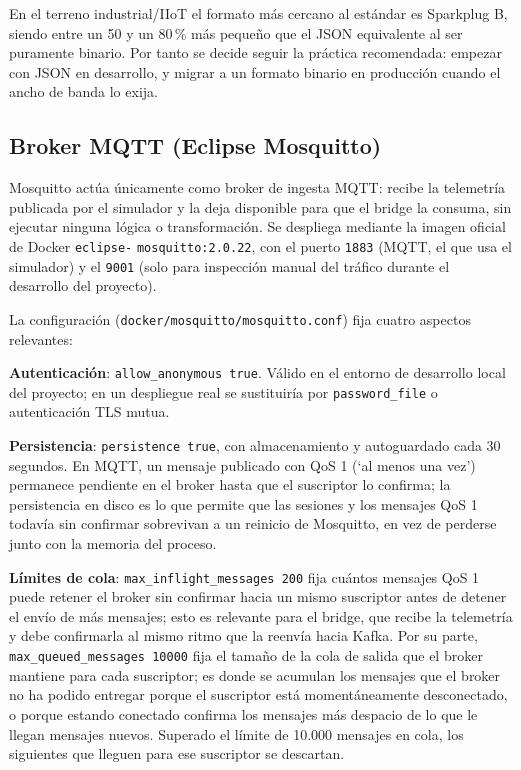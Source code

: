 En el terreno industrial/IIoT el formato más cercano al estándar es Sparkplug B, siendo entre un 50 y un 80\,\% más pequeño que el JSON equivalente al ser puramente binario. Por tanto se decide seguir la práctica recomendada: empezar con JSON en desarrollo, y migrar a un formato binario en producción cuando el ancho de banda lo exija.

\subsection{Broker MQTT (Eclipse Mosquitto)}
\label{sec:mosquitto}

Mosquitto actúa únicamente como broker de ingesta MQTT: recibe la telemetría publicada por el simulador y la deja disponible para que el bridge la consuma, sin ejecutar ninguna lógica o transformación. Se despliega mediante la imagen oficial de Docker \texttt{eclipse-} \texttt{mosquitto:2.0.22}, con el puerto \texttt{1883} (MQTT, el que usa el simulador) y el \texttt{9001} (solo para inspección manual del tráfico durante el desarrollo del proyecto).

La configuración (\texttt{docker/mosquitto/mosquitto.conf}) fija cuatro aspectos relevantes:

\textbf{Autenticación}: \texttt{allow\_anonymous true}. Válido en el entorno de desarrollo local del proyecto; en un despliegue real se sustituiría por \texttt{password\_file} o autenticación TLS mutua.

\textbf{Persistencia}: \texttt{persistence true}, con almacenamiento y autoguardado cada 30 segundos. En MQTT, un mensaje publicado con QoS 1 (`al menos una vez') permanece pendiente en el broker hasta que el suscriptor lo confirma; la persistencia en disco es lo que permite que las sesiones y los mensajes QoS 1 todavía sin confirmar sobrevivan a un reinicio de Mosquitto, en vez de perderse junto con la memoria del proceso.

\textbf{Límites de cola}: \texttt{max\_inflight\_messages 200} fija cuántos mensajes QoS 1 puede retener el broker sin confirmar hacia un mismo suscriptor antes de detener el envío de más mensajes; esto es relevante para el bridge, que recibe la telemetría y debe confirmarla al mismo ritmo que la reenvía hacia Kafka. Por su parte, \texttt{max\_queued\_messages 10000} fija el tamaño de la cola de salida que el broker mantiene para cada suscriptor; es donde se acumulan los mensajes que el broker no ha podido entregar porque el suscriptor está momentáneamente desconectado, o porque estando conectado confirma los mensajes más despacio de lo que le llegan mensajes nuevos. Superado el límite de 10.000 mensajes en cola, los siguientes que lleguen para ese suscriptor se descartan.

